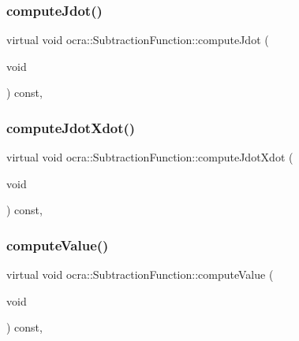\subsubsection{\texorpdfstring{compute\+Jdot()}{computeJdot()}}
{\footnotesize\ttfamily virtual void ocra\+::\+Subtraction\+Function\+::compute\+Jdot (\begin{DoxyParamCaption}\item[{void}]{ }\end{DoxyParamCaption}) const\hspace{0.3cm}{\ttfamily [protected]}, {\ttfamily [virtual]}}

\hypertarget{classocra_1_1SubtractionFunction_aeca1fe085ed1302c87e7ed4ee80082ed}{}\label{classocra_1_1SubtractionFunction_aeca1fe085ed1302c87e7ed4ee80082ed} 
\subsubsection{\texorpdfstring{compute\+Jdot\+Xdot()}{computeJdotXdot()}}
{\footnotesize\ttfamily virtual void ocra\+::\+Subtraction\+Function\+::compute\+Jdot\+Xdot (\begin{DoxyParamCaption}\item[{void}]{ }\end{DoxyParamCaption}) const\hspace{0.3cm}{\ttfamily [protected]}, {\ttfamily [virtual]}}

\hypertarget{classocra_1_1SubtractionFunction_a4cdbb66a83d1113ecea252898ec1bda3}{}\label{classocra_1_1SubtractionFunction_a4cdbb66a83d1113ecea252898ec1bda3} 
\subsubsection{\texorpdfstring{compute\+Value()}{computeValue()}}
{\footnotesize\ttfamily virtual void ocra\+::\+Subtraction\+Function\+::compute\+Value (\begin{DoxyParamCaption}\item[{void}]{ }\end{DoxyParamCaption}) const\hspace{0.3cm}{\ttfamily [protected]}, {\ttfamily [virtual]}}

